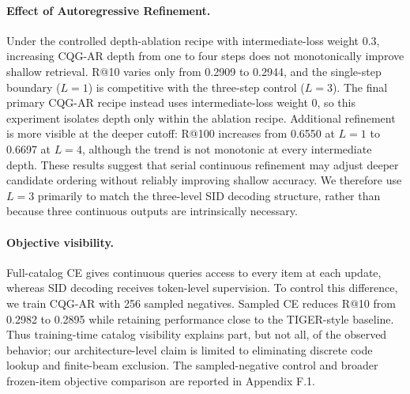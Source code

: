 \documentclass[preprint,12pt]{elsarticle}
\begin{document}
\paragraph{Effect of Autoregressive Refinement.}
Under the controlled depth-ablation recipe with intermediate-loss weight 0.3,
increasing CQG-AR depth from one to four steps does not monotonically improve
shallow retrieval. R@10 varies only from 0.2909 to 0.2944, and the single-step
boundary ($L=1$) is competitive with the three-step control ($L=3$).
The final primary CQG-AR recipe instead uses intermediate-loss weight 0, so
this experiment isolates depth only within the ablation recipe. Additional refinement is more visible at the deeper cutoff:
R@100 increases from 0.6550 at $L=1$ to 0.6697 at $L=4$, although the trend is
not monotonic at every intermediate depth. These results suggest that serial
continuous refinement may adjust deeper candidate ordering without reliably
improving shallow accuracy. We therefore use $L=3$ primarily to match the
three-level SID decoding structure, rather than because three continuous
outputs are intrinsically necessary.

\paragraph{Objective visibility.}
Full-catalog CE gives continuous queries access to every item at each update,
whereas SID decoding receives token-level supervision. To control this
difference, we train CQG-AR with 256 sampled negatives. Sampled CE reduces
R@10 from 0.2982 to 0.2895 while retaining performance close to the
TIGER-style baseline. Thus training-time catalog visibility explains part,
but not all, of the observed behavior; our architecture-level claim is
limited to eliminating discrete code lookup and finite-beam exclusion.
The sampled-negative control and broader frozen-item objective comparison are
reported in Appendix F.1.

\end{document}
